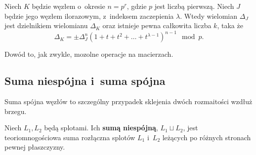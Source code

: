 \begin{proposition}
    Niech $K$ będzie węzłem o~okresie $n = p^r$, gdzie $p$ jest liczbą pierwszą.
    Niech $J$ będzie jego węzłem ilorazowym, z~indeksem zaczepienia $\lambda$.
    Wtedy wielomian $\Delta_J$ jest dzielnikiem wielomianu $\Delta_K$ oraz istnieje pewna całkowita liczba $k$, taka że
    \[
        \Delta_K = \pm \Delta_J^n \left(1 + t + t^2 + \ldots + t^{\lambda - 1}\right)^{n-1} \mod p.
    \]
\end{proposition}

Dowód to, jak zwykle, mozolne operacje na macierzach.


\subsection{Suma niespójna i~suma spójna} %
\label{sub:knot_sum}
Suma spójna węzłów to szczególny przypadek sklejenia dwóch rozmaitości wzdłuż brzegu.

\begin{definition}
    Niech $L_1, L_2$ będą splotami.
    Ich \textbf{sumą niespójną}, $L_1 \sqcup L_2$,
    jest teoriomnogościowa suma rozłączna splotów
    $L_1$ i~$L_2$ leżących po różnych stronach pewnej płaszczyzny.
\end{definition}

